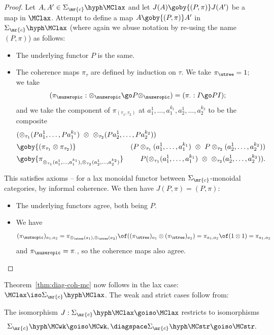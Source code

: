 \begin{proof}
Let $A, A' \in \Sigma_\mr{c}\hyph\MClax$ and let $J(A) \goby{(P,\pi)}
J(A')$ be a map in $\MClax$.  Attempt to define a map $A \goby{(P,\pi)} A'$
in $\Sigma_\mr{c}\hyph\MClax$ (where again we abuse notation by
re-using the name $(P,\pi)$) as follows:
%
\begin{itemize}
\item The underlying functor $P$ is the same.
\item The coherence maps $\pi_\tau$ are defined by induction on $\tau$.  We
take $\pi_\utree = 1$; we take
\[
(\pi_\nuzeropic: \otimes_\nuzeropic \go P\otimes_\nuzeropic)
=
(\pi_\cdot: I \go PI);
\]
and we take the component of $\pi_{(\tau_1, \tau_2)}$ at $a_1^1,
\ldots, a_1^{k_1}, a_2^1, \ldots, a_2^{k_2}$
to be the composite
%
\begin{eqnarray*}
\lefteqn{
(\otimes_{\tau_1}(Pa_1^1, \ldots, Pa_1^{k_1}) 
\ \otimes\ 
\otimes_{\tau_2}(Pa_2^1, \ldots, Pa_2^{k_2}) )}	\\ &
\goby{(\pi_{\tau_1} \otimes \pi_{\tau_2})}	&
(P\otimes_{\tau_1}(a_1^1, \ldots, a_1^{k_1}) \ \otimes\ 
P\otimes_{\tau_2}(a_2^1, \ldots, a_2^{k_2}))	\\
&
\goby{\pi_{\otimes_{\tau_1}(a_1^1, \ldots, a_1^{k_1}),
\otimes_{\tau_2}(a_2^1, \ldots, a_2^{k_2})}} 	&
P(\otimes_{\tau_1}(a_1^1, \ldots, a_1^{k_1}) \ \otimes\ 
\otimes_{\tau_2}(a_2^1, \ldots, a_2^{k_2})).
\end{eqnarray*}
%
\end{itemize}
% 
This satisfies axioms -- for a lax monoidal
functor between $\Sigma_\mr{c}$-monoidal categories, by informal coherence.
We then have $J(P,\pi) = (P, \pi)$:
%
\begin{itemize}
\item The underlying functors agree, both being $P$.
\item We have
\[
(\pi_\nutwopic)_{a_1,a_2}
= \pi_{\otimes_\utree(a_1), \otimes_\utree(a_2)} \of
((\pi_\utree)_{a_1} \otimes (\pi_\utree)_{a_2})
= \pi_{a_1, a_2} \of (1 \otimes 1)
= \pi_{a_1, a_2}
\]
and $\pi_\nuzeropic = \pi_\cdot$, so the coherence maps also agree.
\done
\end{itemize}
\end{proof}%
%
%

Theorem~\ref{thm:diag-coh-mc} now follows in the lax case: $\MClax \iso
\Sigma_\mr{c}\hyph\MClax$.  The weak and strict cases follow from:

\begin{lemma}
The isomorphism $J: \Sigma_\mr{c}\hyph\MClax \goiso \MClax$ restricts to
isomorphisms
\[
\Sigma_\mr{c}\hyph\MCwk \goiso \MCwk,
\diagspace
\Sigma_\mr{c}\hyph\MCstr \goiso \MCstr.
\]
\end{lemma}

